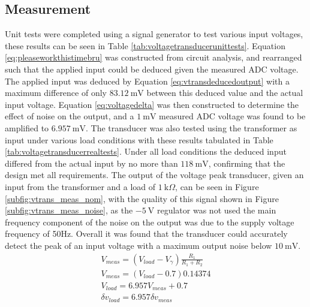 \subsection{Measurement} \label{sec:vtrans_meas}
Unit tests were completed using a signal generator to test various input voltages, these results can be seen in Table \ref{tab:voltagetransducerunittests}. Equation \ref{eq:pleaseworkthistimebru} was constructed from circuit analysis, and rearranged such that the applied input could be deduced given the measured ADC voltage. The applied input was deduced by Equation \ref{eq:vtransdeducedoutput} with a maximum difference of only $\SI{83.12}{\milli \volt}$ between this deduced value and the actual input voltage. Equation \ref{eq:voltagedelta} was then constructed to determine the effect of noise on the output, and a $\SI{1}{\milli \volt}$ measured ADC voltage was found to be amplified to $\SI{6.957}{\milli \volt}$. The transducer was also tested using the transformer as input under various load conditions with these results tabulated in Table \ref{tab:voltagetransducerrealtests}. Under all load conditions the deduced input differed from the actual input by no more than $\SI{118}{\milli \volt}$, confirming that the design met all requirements. The output of the voltage peak transducer, given an input from the transformer and a load of $\SI{1}{\kilo \Omega}$, can be seen in Figure \ref{subfig:vtrans_meas_nom}, with the quality of this signal shown in Figure \ref{subfig:vtrans_meas_noise}, as the $\SI{-5}{\volt}$ regulator was not used the main frequency component of the noise on the output was due to the supply voltage frequency of 50Hz. Overall it was found that the transducer could accurately detect the peak of an input voltage with a maximum output noise below $\SI{10}{\milli \volt}$.
\begin{align}
  V_{meas} = (V_{load}-V_{\gamma})\frac{R_1}{R_1+R_2} \label{eq:pleaseworkthistimebru}\\
  V_{meas} = (V_{load}-0.7)0.14374 \nonumber  \\
  V_{load} = 6.957V_{meas}+0.7 \label{eq:vtransdeducedoutput} \\
  \delta v_{load} = 6.957\delta v_{meas}\label{eq:voltagedelta}
\end{align}


